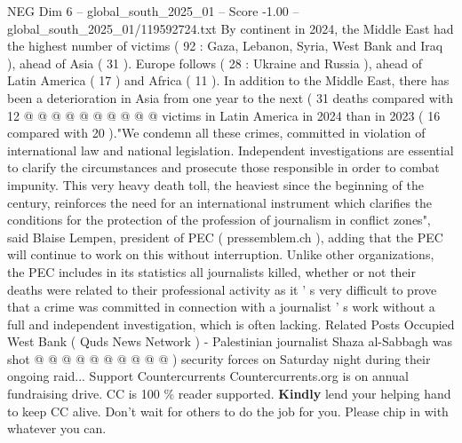 \begin{textsample}{NEG Dim 6 – global\_south\_2025\_01 – Score -1.00 – global\_south\_2025\_01/119592724.txt}
By continent in 2024, the Middle East had the highest number of victims ( 92 : Gaza, Lebanon, Syria, West Bank and Iraq ), ahead of Asia ( 31 ).
Europe follows ( 28 : Ukraine and Russia ), ahead of Latin America ( 17 ) and Africa ( 11 ).
In addition to the Middle East, there has been a deterioration in Asia from one year to the next ( 31 deaths compared with 12 @ @ @ @ @ @ @ @ @ @ victims in Latin America in 2024 than in 2023 ( 16 compared with 20 )."We condemn all these crimes, committed in violation of international law and national legislation.
Independent investigations are essential to clarify the circumstances and prosecute those responsible in order to combat impunity.
This very heavy death toll, the heaviest since the beginning of the century, reinforces the need for an international instrument which clarifies the conditions for the protection of the profession of journalism in conflict zones", said Blaise Lempen, president of PEC ( pressemblem.ch ), adding that the PEC will continue to work on this without interruption.
Unlike other organizations, the PEC includes in its statistics all journalists killed, whether or not their deaths were related to their professional activity as it ' s very difficult to prove that a crime was committed in connection with a journalist ' s work without a full and independent investigation, which is often lacking.
Related Posts Occupied West Bank ( Quds News Network ) - Palestinian journalist Shaza al-Sabbagh was shot @ @ @ @ @ @ @ @ @ @ ) security forces on Saturday night during their ongoing raid...
Support Countercurrents Countercurrents.org is on annual fundraising drive.
CC is 100 \% reader supported. \textbf{Kindly} lend your helping hand to keep CC alive.
Don't wait for others to do the job for you.
Please chip in with whatever you can.

\end{textsample}
